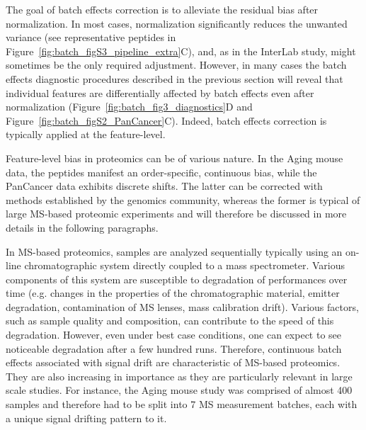 \documentclass[num-refs]{wiley-article}
\begin{document}
The goal of batch effects correction is to alleviate the residual bias after normalization. In most cases, normalization significantly reduces the unwanted variance (see representative peptides in Figure~\ref{fig:batch_figS3_pipeline_extra}C), and, as in the InterLab study, might sometimes be the only required adjustment. However, in many cases the batch effects diagnostic procedures described in the previous section will reveal that individual features are differentially affected by batch effects even after normalization (Figure~\ref{fig:batch_fig3_diagnostics}D and Figure~\ref{fig:batch_figS2_PanCancer}C). Indeed, batch effects correction is typically applied at the feature-level.

Feature-level bias in proteomics can be of various nature. In the Aging mouse data, the peptides manifest an order-specific, continuous bias, while the PanCancer data exhibits discrete shifts. The latter can be corrected with methods established by the genomics community, whereas the former is typical of large MS-based proteomic experiments and will therefore be discussed in more details in the following paragraphs.

In MS-based proteomics, samples are analyzed sequentially typically using an on-line chromatographic system directly coupled to a mass spectrometer. Various components of this system are susceptible to degradation of performances over time (e.g. changes in the properties of the chromatographic material, emitter degradation, contamination of MS lenses, mass calibration drift). Various factors, such as sample quality and composition, can contribute to the speed of this degradation. However, even under best case conditions, one can expect to see noticeable degradation after a few hundred runs. Therefore, continuous batch effects associated with signal drift are characteristic of MS-based proteomics. They are also increasing in importance as they are particularly relevant in large scale studies. For instance, the Aging mouse study was comprised of almost 400 samples and therefore had to be split into 7 MS measurement batches, each with a unique signal drifting pattern to it.
\end{document}
